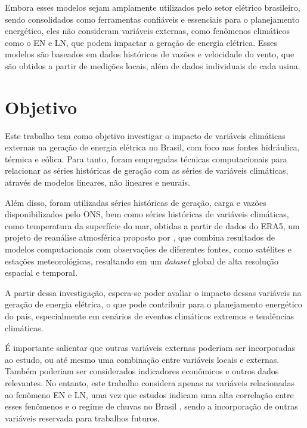 Embora esses modelos sejam amplamente utilizados pelo setor elétrico brasileiro, sendo consolidados como ferramentas
confiáveis e essenciais para o planejamento energético, eles não consideram variáveis externas, como fenômenos climáticos
como o EN e LN, que podem impactar a geração de energia elétrica. Esses modelos são baseados em dados históricos de
vazões e velocidade do vento, que são obtidos a partir de medições locais, além de dados individuais de cada usina.

\section{Objetivo}
Este trabalho tem como objetivo investigar o impacto de variáveis climáticas externas na geração 
de energia elétrica no Brasil, com foco nas fontes hidráulica, térmica e eólica. Para tanto, foram empregadas técnicas 
computacionais para relacionar as séries históricas de geração com as séries de variáveis 
climáticas, através de modelos lineares, não lineares e neurais. 

Além disso, foram utilizadas séries históricas de geração, 
carga e vazões disponibilizados pelo ONS, bem como séries históricas de variáveis climáticas, como temperatura 
da superfície do mar, obtidas a partir de dados do ERA5, um projeto de reanálise atmosférica proposto por , 
que combina resultados de modelos computacionais com observações de diferentes fontes, como satélites e estações 
meteorológicas, resultando em um \textit{dataset} global de alta resolução espacial e temporal.

A partir dessa investigação, espera-se poder avaliar o impacto dessas variáveis na geração de energia elétrica,
o que pode contribuir para o planejamento energético do país, especialmente em cenários de eventos climáticos extremos e
tendências climáticas.

É importante salientar que outras variáveis externas poderiam ser incorporadas ao estudo, ou até mesmo uma combinação entre
 variáveis locais e externas. Também poderiam ser considerados indicadores econômicos e outros dados relevantes. 
No entanto, este trabalho considera apenas as variáveis relacionadas ao fenômeno EN e LN, uma vez que estudos indicam
uma alta correlação entre esses fenômenos e o regime de chuvas no Brasil \cite{de2012influencia, Andreoli2016}, sendo a 
incorporação de outras variáveis reservada para trabalhos futuros.

